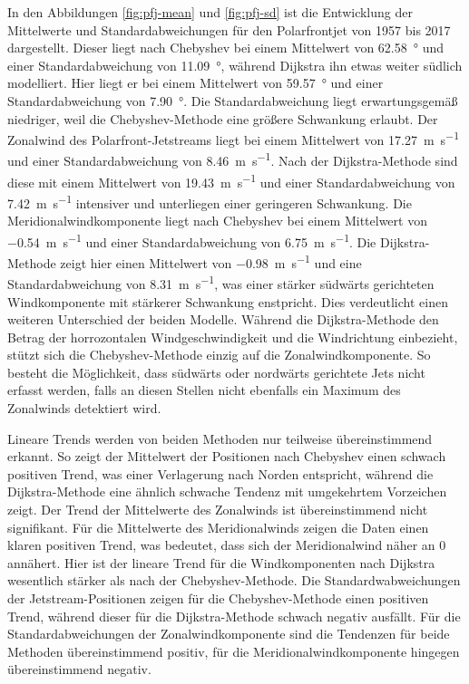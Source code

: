In den Abbildungen \ref{fig:pfj-mean} und \ref{fig:pfj-sd} ist die Entwicklung der Mittelwerte und Standardabweichungen für den Polarfrontjet von 1957 bis 2017 dargestellt. Dieser liegt nach Chebyshev bei einem Mittelwert von \SI{62.58}{\degree} und einer Standardabweichung von \SI{11.09}{\degree}, während Dijkstra ihn etwas weiter südlich modelliert. Hier liegt er bei einem Mittelwert von \SI{59.57}{\degree} und einer Standardabweichung von \SI{7.90}{\degree}. Die Standardabweichung liegt erwartungsgemäß niedriger, weil die Chebyshev-Methode eine größere Schwankung erlaubt. Der Zonalwind des Polarfront-Jetstreams liegt bei einem Mittelwert von \SI{17.27}{\metre\per\second} und einer Standardabweichung von \SI{8.46}{\metre\per\second}. Nach der Dijkstra-Methode sind diese mit einem Mittelwert von \SI{19.43}{\metre\per\second} und einer Standardabweichung von \SI{7.42}{\metre\per\second} intensiver und unterliegen einer geringeren Schwankung. Die Meridionalwindkomponente liegt nach Chebyshev bei einem Mittelwert von \SI{-0.54}{\metre\per\second} und einer Standardabweichung von \SI{6.75}{\metre\per\second}. Die Dijkstra-Methode zeigt hier einen Mittelwert von \SI{-0.98}{\metre\per\second} und eine Standardabweichung von \SI{8.31}{\metre\per\second}, was einer stärker südwärts gerichteten Windkomponente mit stärkerer Schwankung enstpricht. Dies verdeutlicht einen weiteren Unterschied der beiden Modelle. Während die Dijkstra-Methode den Betrag der horrozontalen Windgeschwindigkeit und die Windrichtung einbezieht, stützt sich die Chebyshev-Methode einzig auf die Zonalwindkomponente. So besteht die Möglichkeit, dass südwärts oder nordwärts gerichtete Jets nicht erfasst werden, falls an diesen Stellen nicht ebenfalls ein Maximum des Zonalwinds detektiert wird.

Lineare Trends werden von beiden Methoden nur teilweise übereinstimmend erkannt. So zeigt der Mittelwert der Positionen nach Chebyshev einen schwach positiven Trend, was einer Verlagerung nach Norden entspricht, während die Dijkstra-Methode eine ähnlich schwache Tendenz mit umgekehrtem Vorzeichen zeigt. Der Trend der Mittelwerte des Zonalwinds ist übereinstimmend nicht signifikant. Für die Mittelwerte des Meridionalwinds zeigen die Daten einen klaren positiven Trend, was bedeutet, dass sich der Meridionalwind näher an $0$ annähert. Hier ist der lineare Trend für die Windkomponenten nach Dijkstra wesentlich stärker als nach der Chebyshev-Methode. Die Standardwabweichungen der Jetstream-Positionen zeigen für die Chebyshev-Methode einen positiven Trend, während dieser für die Dijkstra-Methode schwach negativ ausfällt. Für die Standardabweichungen der Zonalwindkomponente sind die Tendenzen für beide Methoden übereinstimmend positiv, für die Meridionalwindkomponente hingegen übereinstimmend negativ.

